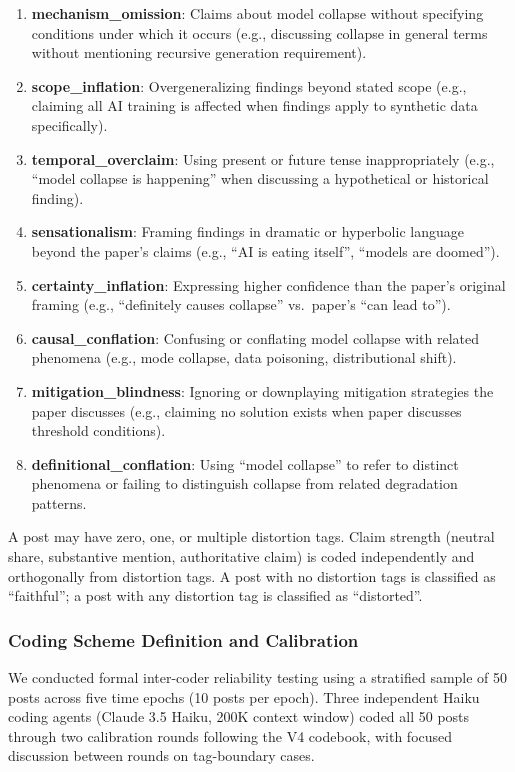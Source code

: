 \documentclass[twocolumn,11pt]{article}
\begin{document}
\begin{enumerate}
\item \textbf{mechanism\_omission}: Claims about model collapse without specifying conditions under which it occurs (e.g., discussing collapse in general terms without mentioning recursive generation requirement).
\item \textbf{scope\_inflation}: Overgeneralizing findings beyond stated scope (e.g., claiming all AI training is affected when findings apply to synthetic data specifically).
\item \textbf{temporal\_overclaim}: Using present or future tense inappropriately (e.g., ``model collapse is happening'' when discussing a hypothetical or historical finding).
\item \textbf{sensationalism}: Framing findings in dramatic or hyperbolic language beyond the paper's claims (e.g., ``AI is eating itself'', ``models are doomed'').
\item \textbf{certainty\_inflation}: Expressing higher confidence than the paper's original framing (e.g., ``definitely causes collapse'' vs.\ paper's ``can lead to'').
\item \textbf{causal\_conflation}: Confusing or conflating model collapse with related phenomena (e.g., mode collapse, data poisoning, distributional shift).
\item \textbf{mitigation\_blindness}: Ignoring or downplaying mitigation strategies the paper discusses (e.g., claiming no solution exists when paper discusses threshold conditions).
\item \textbf{definitional\_conflation}: Using ``model collapse'' to refer to distinct phenomena or failing to distinguish collapse from related degradation patterns.
\end{enumerate}

A post may have zero, one, or multiple distortion tags. Claim strength (neutral share, substantive mention, authoritative claim) is coded independently and orthogonally from distortion tags. A post with no distortion tags is classified as ``faithful''; a post with any distortion tag is classified as ``distorted''.

\subsubsection{Coding Scheme Definition and Calibration}

We conducted formal inter-coder reliability testing using a stratified sample of 50 posts across five time epochs (10 posts per epoch). Three independent Haiku coding agents (Claude 3.5 Haiku, 200K context window) coded all 50 posts through two calibration rounds following the V4 codebook, with focused discussion between rounds on tag-boundary cases.
\end{document}
